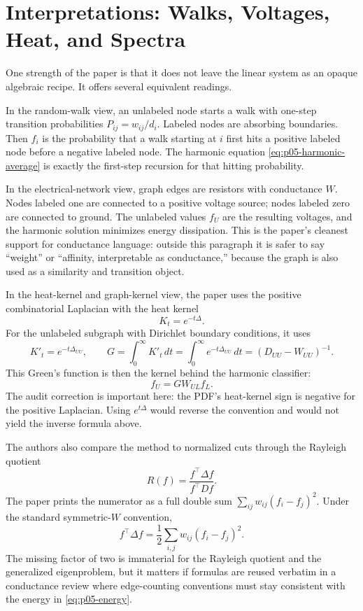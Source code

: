 \documentclass[11pt]{article}
\begin{document}
\FloatBarrier

\section{Interpretations: Walks, Voltages, Heat, and Spectra}

One strength of the paper is that it does not leave the linear system as an
opaque algebraic recipe. It offers several equivalent readings.

In the random-walk view, an unlabeled node starts a walk with one-step
transition probabilities \(P_{ij}=w_{ij}/d_i\). Labeled nodes are absorbing
boundaries. Then \(f_i\) is the probability that a walk starting at \(i\) first
hits a positive labeled node before a negative labeled node. The harmonic
equation \eqref{eq:p05-harmonic-average} is exactly the first-step recursion for
that hitting probability.

In the electrical-network view, graph edges are resistors with conductance
\(W\). Nodes labeled one are connected to a positive voltage source; nodes
labeled zero are connected to ground. The unlabeled values \(f_U\) are the
resulting voltages, and the harmonic solution minimizes energy dissipation. This
is the paper's cleanest support for conductance language: outside this paragraph
it is safer to say ``weight'' or ``affinity, interpretable as conductance,''
because the graph is also used as a similarity and transition object.

In the heat-kernel and graph-kernel view, the paper uses the positive
combinatorial Laplacian with the heat kernel
\[
  K_t=e^{-t\Delta}.
\]
For the unlabeled subgraph with Dirichlet boundary conditions, it uses
\begin{equation}
  K'_t=e^{-t\Delta_{UU}},
  \qquad
  G=\int_0^\infty K'_t\,dt
    =\int_0^\infty e^{-t\Delta_{UU}}\,dt
    =(D_{UU}-W_{UU})^{-1}.
  \label{eq:p05-green}
\end{equation}
This Green's function is then the kernel behind the harmonic classifier:
\[
  f_U = G W_{UL}f_L.
\]
The audit correction is important here: the PDF's heat-kernel sign is negative
for the positive Laplacian. Using \(e^{t\Delta}\) would reverse the convention
and would not yield the inverse formula above.

The authors also compare the method to normalized cuts through the Rayleigh
quotient
\[
  R(f)=\frac{f^\top \Delta f}{f^\top D f}.
\]
The paper prints the numerator as a full double sum
\(\sum_{ij}w_{ij}(f_i-f_j)^2\). Under the standard symmetric-\(W\) convention,
\[
  f^\top \Delta f
  =
  \frac{1}{2}\sum_{i,j}w_{ij}(f_i-f_j)^2.
\]
The missing factor of two is immaterial for the Rayleigh quotient and the
generalized eigenproblem, but it matters if formulas are reused verbatim in a
conductance review where edge-counting conventions must stay consistent with
the energy in \eqref{eq:p05-energy}.
\end{document}
